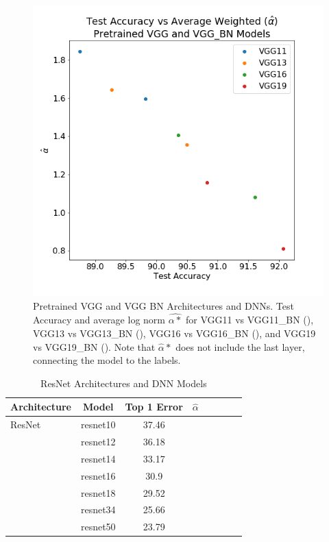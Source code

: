 \begin{figure}[!htb]
 \centering
   \includegraphics[scale=0.40]{img/vgg-w_alphas.png}
   \caption{
Pretrained VGG and VGG BN Architectures and DNNs.  Test Accuracy and average log norm $\hat{\alpha*}$ for
 VGG11 vs VGG11\_BN ({\color{blue}{blue}}),
VGG13 vs VGG13\_BN ({\color{orange}{orange}}),
VGG16 vs VGG16\_BN ({\color{green}{green}}),  and
VGG19 vs VGG19\_BN ({\color{red}{red}}). 
Note that $\hat{\alpha}*$ does not include the last layer, connecting the model to the labels.
}
  \label{fig:vgg}
\end{figure}



\begin{table}[t]
\small
\begin{center}
\begin{tabular}{|p{1in}|c|c|c|c|c|c|c|}
\hline
Architecture 
 & Model
 & Top 1 Error & $\hat{\alpha}$ \\
\hline
ResNet  & resnet10 & 37.46 & \\
& resnet12 & 36.18 & \\
& resnet14 & 33.17 & \\
& resnet16 & 30.9 & \\
& resnet18 & 29.52 & \\
& resnet34 & 25.66 & \\
& resnet50 & 23.79 & \\
\hline
\end{tabular}
\end{center}
\caption{ResNet Architectures and DNN Models}
\label{table:models}
\end{table}


